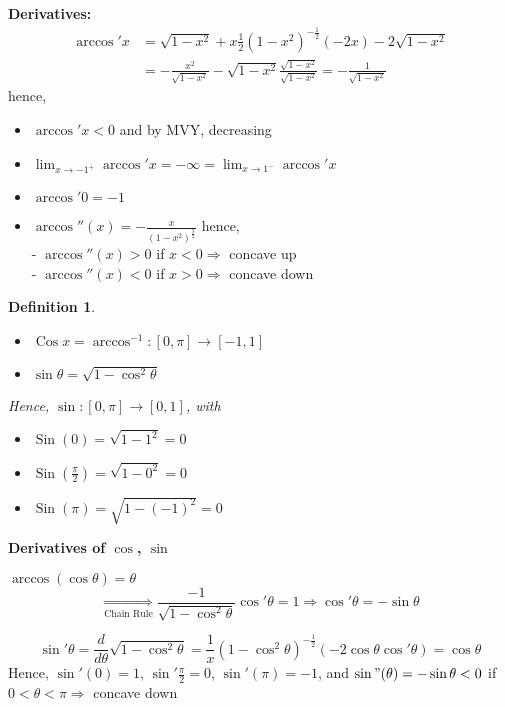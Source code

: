 \documentclass[12pt]{article}
\theoremstyle{plain}
\newtheorem{definition}{Definition}[subsection]
\DeclareMathOperator{\Sin}{Sin}
\DeclareMathOperator{\Cos}{Cos}
\begin{document}
	\textbf{Derivatives:}
	\begin{align*}
		\arccos ' x 
		&= \sqrt{1-x^2} + x\frac12(1-x^2)^{-\frac 12} (-2x) - 2\sqrt{1-x^2}\\
		&= -\frac{x^2}{\sqrt{1-x^2}}-\sqrt{1-x^2}\frac{\sqrt{1-x^2}}
			{\sqrt{1-x^2}} = -\frac{1}{\sqrt{1-x^2}}
	\end{align*}
	hence, 
	\begin{itemize}
		\item $\arccos 'x < 0$ and by MVY, decreasing
		\item $\lim_{x\to -1^+} \arccos 'x = -\infty = \lim_{x\to 1^-}
			\arccos 'x$ 
		\item $\arccos '0=-1$
		\item $\arccos ''(x) = -\frac x{(1-x^2)^{\frac 32}}$ hence, \\
			- $\arccos ''(x) > 0$ if $x <0  \Rightarrow $ concave up\\
			- $\arccos ''(x) <0$ if $x > 0 \Rightarrow$ concave down\\
	\end{itemize}

	\begin{definition}
		$ $
		\begin{itemize}
			\item $\Cos x = \arccos ^{-1} : [0,\pi] \to [-1,1]$

			\item $\sin \theta = \sqrt{1-\cos^2 \theta}$
		\end{itemize}
				
		Hence, $\sin:[0,\pi] \to [0,1]$, with 
		\begin{itemize}
			\item $\Sin(0) = \sqrt{1-1^2} = 0$
			\item $\Sin(\frac{\pi}2) = \sqrt{1-0^2} = 0$
			\item $\Sin(\pi) = \sqrt{1-(-1)^2} = 0$
		\end{itemize}
	\end{definition}

	\textbf{Derivatives of $\cos$, $\sin$}
	
	$\arccos (\cos \theta) = \theta$
	\[
		\underset{\text{Chain Rule}} {\Rightarrow}
		\frac{-1}{\sqrt{1-\cos^2 \theta}} \cos '\theta=1
		\Rightarrow \cos'\theta = -\sin \theta
	\]
	
	\[
		\sin'\theta = \frac d{d\theta} \sqrt{1-\cos^2\theta} 
		= \frac1x(1-\cos^2 \theta) ^{-\frac12} (-2\cos \theta \cos'\theta)
		= \cos \theta
	\]
	Hence, $\sin'(0)=1$, $\sin'\frac{\pi}2 = 0$, $\sin'(\pi) = -1$, and 
	$\sin"(\theta) = -\sin \theta < 0$ if $0<\theta < \pi \Rightarrow$
	concave down
\end{document}
